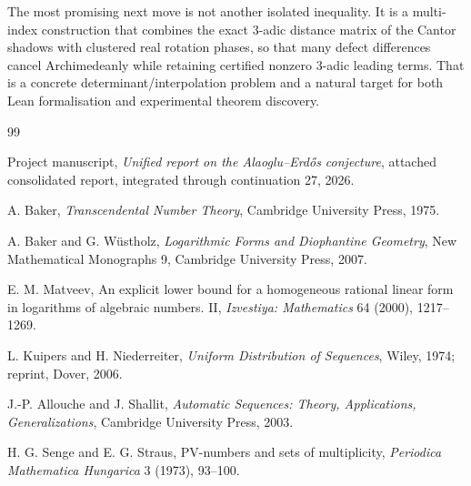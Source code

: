 \documentclass[11pt]{article}
\theoremstyle{definition}
\theoremstyle{remark}
\begin{document}
The most promising next move is not another isolated inequality.  It is a
multi-index construction that combines the exact $3$-adic distance matrix of
the Cantor shadows with clustered real rotation phases, so that many defect
differences cancel Archimedeanly while retaining certified nonzero
$3$-adic leading terms.  That is a concrete determinant/interpolation problem
and a natural target for both Lean formalisation and experimental theorem
discovery.

\begin{thebibliography}{99}

Project manuscript,
\emph{Unified report on the Alaoglu--Erd\H{o}s conjecture},
attached consolidated report, integrated through continuation 27, 2026.

A. Baker,
\emph{Transcendental Number Theory},
Cambridge University Press, 1975.

A. Baker and G. W\"ustholz,
\emph{Logarithmic Forms and Diophantine Geometry},
New Mathematical Monographs 9, Cambridge University Press, 2007.

E. M. Matveev,
An explicit lower bound for a homogeneous rational linear form in logarithms
of algebraic numbers. II,
\emph{Izvestiya: Mathematics} 64 (2000), 1217--1269.

L. Kuipers and H. Niederreiter,
\emph{Uniform Distribution of Sequences},
Wiley, 1974; reprint, Dover, 2006.

J.-P. Allouche and J. Shallit,
\emph{Automatic Sequences: Theory, Applications, Generalizations},
Cambridge University Press, 2003.

H. G. Senge and E. G. Straus,
PV-numbers and sets of multiplicity,
\emph{Periodica Mathematica Hungarica} 3 (1973), 93--100.

\end{thebibliography}
\end{document}
